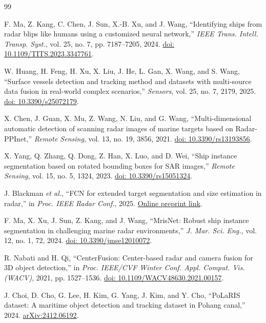 \documentclass[twocolumn, 10pt]{article}
\begin{document}
\clearpage

\begin{thebibliography}{99}

F. Ma, Z. Kang, C. Chen, J. Sun, X.-B. Xu, and J. Wang, “Identifying ships from radar blips like humans using a customized neural network,” \textit{IEEE Trans. Intell. Transp. Syst.}, vol. 25, no. 7, pp. 7187–7205, 2024. \href{https://doi.org/10.1109/TITS.2023.3347761}{doi: 10.1109/TITS.2023.3347761}.

W. Huang, H. Feng, H. Xu, X. Liu, J. He, L. Gan, X. Wang, and S. Wang, “Surface vessels detection and tracking method and datasets with multi-source data fusion in real-world complex scenarios,” \textit{Sensors}, vol. 25, no. 7, 2179, 2025. \href{https://doi.org/10.3390/s25072179}{doi: 10.3390/s25072179}.

X. Chen, J. Guan, X. Mu, Z. Wang, N. Liu, and G. Wang, “Multi-dimensional automatic detection of scanning radar images of marine targets based on Radar-PPInet,” \textit{Remote Sensing}, vol. 13, no. 19, 3856, 2021. \href{https://doi.org/10.3390/rs13193856}{doi: 10.3390/rs13193856}.

X. Yang, Q. Zhang, Q. Dong, Z. Han, X. Luo, and D. Wei, “Ship instance segmentation based on rotated bounding boxes for SAR images,” \textit{Remote Sensing}, vol. 15, no. 5, 1324, 2023. \href{https://doi.org/10.3390/rs15051324}{doi: 10.3390/rs15051324}.

J. Blackman \textit{et al.}, “FCN for extended target segmentation and size estimation in radar,” in \textit{Proc. IEEE Radar Conf.}, 2025. \href{https://www.researchgate.net/publication/393361926}{Online preprint link}.

F. Ma, X. Xu, J. Sun, Z. Kang, and J. Wang, “MrisNet: Robust ship instance segmentation in challenging marine radar environments,” \textit{J. Mar. Sci. Eng.}, vol. 12, no. 1, 72, 2024. \href{https://doi.org/10.3390/jmse12010072}{doi: 10.3390/jmse12010072}.

R. Nabati and H. Qi, “CenterFusion: Center-based radar and camera fusion for 3D object detection,” in \textit{Proc. IEEE/CVF Winter Conf. Appl. Comput. Vis. (WACV)}, 2021, pp. 1527–1536. \href{https://doi.org/10.1109/WACV48630.2021.00157}{doi: 10.1109/WACV48630.2021.00157}.

J. Choi, D. Cho, G. Lee, H. Kim, G. Yang, J. Kim, and Y. Cho, “PoLaRIS dataset: A maritime object detection and tracking dataset in Pohang canal,” 2024. \href{https://arxiv.org/abs/2412.06192}{arXiv:2412.06192}.


\end{thebibliography}
\end{document}

